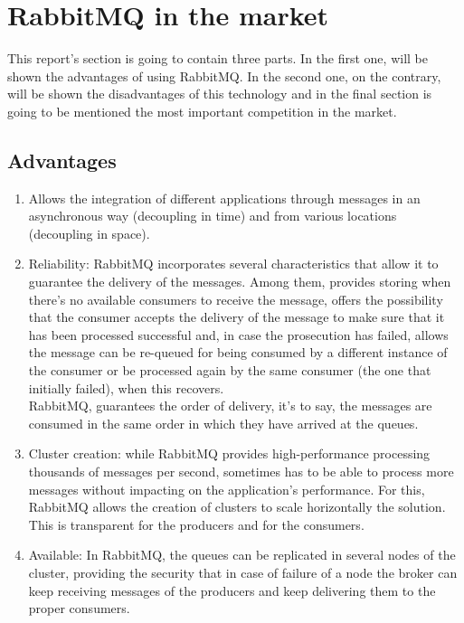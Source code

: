 \documentclass[12pt]{article}
\begin{document}
\section*{RabbitMQ in the  market}
This report's section is going to contain three parts. In the first one, will be shown the advantages of using RabbitMQ. In the second one, on the contrary, will be shown the disadvantages of this technology and in the final section is going to be mentioned the most important competition in the market.

\subsection*{Advantages}
\begin{enumerate}
    \item Allows the integration of different applications through messages in an asynchronous way (decoupling in time) and from various locations (decoupling in space).
    \item Reliability: RabbitMQ incorporates several characteristics that allow it to guarantee the delivery of the messages. Among them, provides storing when there's no available consumers to receive the message, offers the possibility that the consumer accepts the delivery of the message to make sure that it has been processed successful and, in case the prosecution has failed, allows the message can be re-queued for being consumed by a different instance of the consumer or be processed again by the same consumer (the one that initially failed), when this recovers.\\
    RabbitMQ, guarantees the order of delivery, it's to say, the messages are consumed in the same order in which they have arrived at the queues.
    \item Cluster creation: while RabbitMQ provides high-performance processing thousands of messages per second, sometimes has to be able to process more messages without impacting on the application's performance. For this, RabbitMQ allows the creation of clusters to scale horizontally the solution. This is transparent for the producers and for the consumers.
     \item Available: In RabbitMQ, the queues can be replicated in several nodes of the cluster, providing the security that in case of failure of a node the broker can keep receiving messages of the producers and keep delivering them to the proper consumers.

\end{enumerate}
\end{document}
